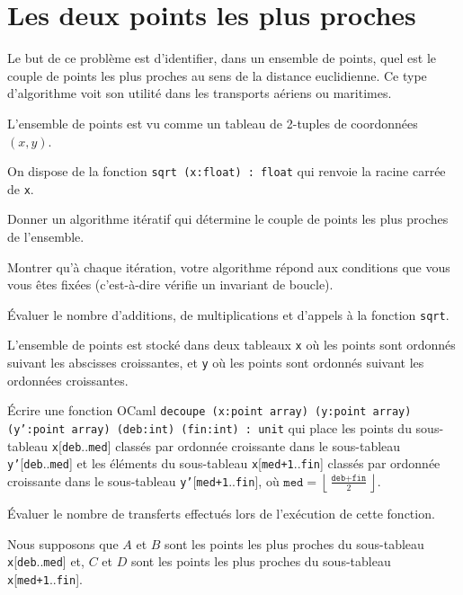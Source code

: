 \renewcommand{\SourceFile}{8-vers-la-recursivite/src/8-3.ml}

\section{Les deux points les plus proches}

Le but de ce problème est d'identifier, dans un ensemble de points, quel est le couple de points les plus proches au sens de la distance euclidienne. Ce type d'algorithme voit son utilité dans les transports aériens ou maritimes.
\medskip

L'ensemble de points est vu comme un tableau de 2-tuples de coordonnées $(x,y)$.
\medskip

On dispose de la fonction \texttt{sqrt (x:float) : float} qui renvoie la racine carrée de \texttt{x}.

\Q
Donner un algorithme itératif qui détermine le couple de points les plus proches de l'ensemble.
\medskip

Montrer qu'à chaque itération, votre algorithme répond aux conditions que vous vous êtes fixées (c'est-à-dire vérifie un invariant de boucle).
\medskip

Évaluer le nombre d'additions, de multiplications et d'appels à la fonction \texttt{sqrt}.
\bigskip

L'ensemble de points est stocké dans deux tableaux \texttt{x} où les points sont ordonnés suivant les abscisses croissantes, et \texttt{y} où les points sont ordonnés suivant les ordonnées croissantes.

\Q
Écrire une fonction OCaml \texttt{decoupe (x:point array) (y:point array) (y':point array) (deb:int) (fin:int) : unit} qui place les points du sous-tableau \texttt{x}[\texttt{deb}..\texttt{med}] classés par ordonnée croissante dans le sous-tableau \texttt{y'}[\texttt{deb}..\texttt{med}] et les éléments du sous-tableau \texttt{x}[\texttt{med+1}..\texttt{fin}] classés par ordonnée croissante dans le sous-tableau \texttt{y'}[\texttt{med+1}..\texttt{fin}], où $\texttt{med}=\left\lfloor\frac{\texttt{deb}+\texttt{fin}}{2} \right\rfloor$.
\medskip

Évaluer le nombre de transferts effectués lors de l'exécution de cette fonction.

\Q
Nous supposons que $A$ et $B$ sont les points les plus proches du sous-tableau \texttt{x}[\texttt{deb}..\texttt{med}] et, $C$ et $D$ sont les points les plus proches du sous-tableau \texttt{x}[\texttt{med+1}..\texttt{fin}].
\medskip

